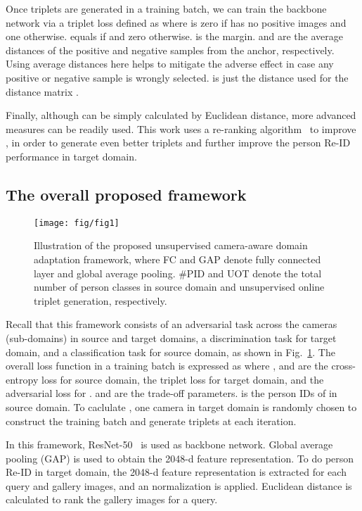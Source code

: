 \documentclass[10pt,twocolumn,letterpaper]{article}
\begin{document}
Once triplets are generated in a training batch, we can train the backbone network via a triplet loss defined as
where  is zero if  has no positive images and one otherwise.
 equals  if  and zero otherwise.  is the margin.  and  are the average distances of the positive and negative samples from the anchor, respectively. Using average distances here helps to mitigate the adverse effect in case any positive or negative sample is wrongly selected.  is just the distance used for the distance matrix .


Finally, although  can be simply calculated by Euclidean distance, more advanced measures can be readily used. This work uses a re-ranking algorithm~\cite{DBLP:conf/cvpr/ZhongZCL17} to improve , in order to generate even better triplets and further improve the person Re-ID performance in target domain. 
 
 
\subsection{The overall proposed framework}\label{sec:TOPF}
\begin{figure}\centering
\texttt{[image: fig/fig1]}
\caption{Illustration of the proposed unsupervised camera-aware domain adaptation framework, where FC and GAP denote fully connected layer and global average pooling. \#PID and UOT denote the total number of person classes in source domain and unsupervised online triplet generation, respectively.}
\label{fig1}
\vspace*{-15pt}\end{figure}
 
Recall that this framework consists of an adversarial task across the cameras (sub-domains) in source and target domains, a discrimination task for target domain, and a classification task for source domain, as shown in Fig.~\ref{fig1}. 
The overall loss function in a training batch is expressed as
where ,  and  are the cross-entropy loss for source domain, the triplet loss for target domain, and the adversarial loss for .  and  are the trade-off parameters.  is the person IDs of  in source domain. To caclulate , one camera in target domain is randomly chosen to construct the training batch and generate triplets at each iteration.
 
In this framework, ResNet-50~\cite{DBLP:conf/cvpr/HeZRS16} is used as backbone network. Global average pooling (GAP) is used to obtain the 2048-d feature representation. To do person Re-ID in target domain, the 2048-d feature representation is extracted for each query and gallery images, and an  normalization is applied. Euclidean distance is calculated to rank the gallery images for a query. 
\end{document}
